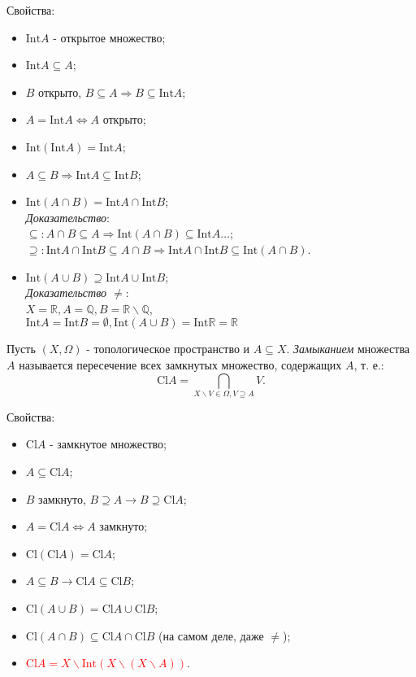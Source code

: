 \documentclass[a4paper,100pt]{article}
\theoremstyle{indented}
\begin{document}
Свойства:
\begin{itemize}
    
    \item $\text{Int} A $ - открытое множество;
    \item $\text{Int} A \subseteq A$;
    \item $B$ открыто, $B\subseteq A \Rightarrow B\subseteq \text{Int} A$;
    \item $A = \text{Int}A \Leftrightarrow A$ открыто;
    \item $\text{Int}(\text{Int} A)=\text{Int}A$;
    \item $A \subseteq B \Rightarrow \text{Int} A \subseteq \text{Int} B$;
    \item $\text{Int}(A\cap B) = \text{Int}A\cap\text{Int}B$; \\ 
    \textit{Доказательство}:\\
    $\subseteq: A\cap B\subseteq A \Rightarrow \text{Int} (A\cap B)\subseteq \text{Int}A \dots$; \\
    $\supseteq: \text{Int}A\cap\text{Int} B \subseteq A\cap B \Rightarrow \text{Int}A\cap\text{Int}B \subseteq \text{Int}(A\cap B)$.
    \item $\text{Int}(A\cup B)\supseteq \text{Int}A\cup\text{Int}B$; \\
    \textit{Доказательство $\neq$}:\\
    $X = \mathbb{R}, A = \mathbb{Q}, B=\mathbb{R}\backslash \mathbb{Q}$, \\
    $\text{Int}A=\text{Int}B = \emptyset , \text{Int}(A\cup B) = \text{Int}\mathbb{R} = \mathbb{R}$


\end{itemize}

Пусть $(X, \Omega)$ - топологическое пространство и $A\subseteq X$. \textit{Замыканием} множества $A$ называется пересечение всех замкнутых множество, содержащих $A$, т. е.:
\[
    \text{Cl} A = \bigcap_{X\backslash V\in \Omega, V\supseteq A} V.
\]

Свойства:
\begin{itemize}
    
    \item $\text{Cl}A$ - замкнутое множество;
    \item $A\subseteq \text{Cl}A$;
    \item $B$ замкнуто, $B\supseteq A \rightarrow B \supseteq \text{Cl}A$;
    \item $A = \text{Cl}A \Leftrightarrow A$ замкнуто;
    \item $\text{Cl}(\text{Cl}A)=\text{Cl}A$;
    \item $A\subseteq B \rightarrow \text{Cl}A\subseteq \text{Cl}B$;
    \item $\text{Cl}(A\cup B)=\text{Cl}A\cup \text{Cl}B$;
    \item $\text{Cl}(A\cap B)\subseteq \text{Cl}A\cap\text{Cl}B $ (на самом деле, даже $\neq$);
    \item \textcolor{red}{$\text{Cl}A=X\backslash \text{Int}(X\backslash(X\backslash A))$}.

\end{itemize}
\end{document}
